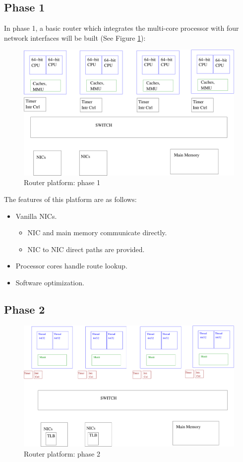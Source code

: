 \documentclass{article}
\begin{document}
\subsection{Phase 1}

	In phase 1, a basic router which integrates the multi-core processor with
	four network interfaces will be built (See Figure \ref{fig:Phase1}):

\begin{figure}
  \centering
  \includegraphics[width=12cm]{figs/Router_I.pdf}
  \caption{Router platform: phase 1}
  \label{fig:Phase1}
\end{figure}

The features of this platform are as follows:
\begin{itemize}
\item Vanilla NICs.
\begin{itemize}
\item NIC and main memory communicate directly.
\item NIC to NIC direct paths are provided.
\end{itemize}
\item Processor cores handle route lookup.
\item Software optimization.
\end{itemize}

\subsection{Phase 2}

\begin{figure}
  \centering
  \includegraphics[width=12cm]{figs/Router_II.pdf}
  \caption{Router platform: phase 2}
  \label{fig:Phase2}
\end{figure}
\end{document}
